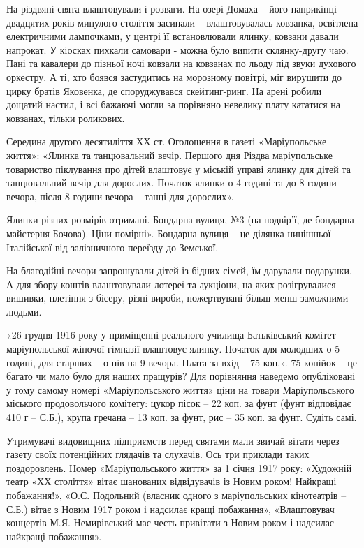 На різдвяні свята влаштовували і розваги. На озері Домаха – його наприкінці
двадцятих років минулого століття засипали – влаштовувалась ковзанка, освітлена
електричними лампочками, у центрі її встановлювали ялинку, ковзани давали
напрокат. У кіосках пихкали самовари - можна було випити склянку-другу чаю.
Пані та кавалери до пізньої ночі ковзали на ковзанах по льоду під звуки
духового оркестру. А ті, хто боявся застудитись на морозному повітрі, міг
вирушити до цирку братів Яковенка, де споруджувався скейтинг-ринг. На арені
робили дощатий настил, і всі бажаючі могли за порівняно невелику плату кататися
на ковзанах, тільки роликових.

Середина другого десятиліття ХХ ст. Оголошення в газеті «Маріупольське життя»:
«Ялинка та танцювальний вечір. Першого дня Різдва маріупольське товариство
піклування про дітей влаштовує у міській управі ялинку для дітей та
танцювальний вечір для дорослих. Початок ялинки о 4 годині та до 8 години
вечора, після 8 години вечора – танці для дорослих».

Ялинки різних розмірів отримані. Бондарна вулиця, №3 (на подвір'ї, де бондарна
майстерня Бочова). Ціни помірні». Бондарна вулиця – це ділянка нинішньої
Італійської від залізничного переїзду до Земської.

На благодійні вечори запрошували дітей із бідних сімей, їм дарували подарунки.
А для збору коштів влаштовували лотереї та аукціони, на яких розігрувалися
вишивки, плетіння з бісеру, різні вироби, пожертвувані більш менш заможними
людьми.

«26 грудня 1916 року у приміщенні реального училища Батьківський комітет
маріупольської жіночої гімназії влаштовує ялинку. Початок для молодших о 5
годині, для старших – о пів на 9 вечора. Плата за вхід – 75 коп.». 75 копійок –
це багато чи мало було для наших пращурів? Для порівняння наведемо опубліковані
у тому самому номері «Маріупольського життя» ціни на товари Маріупольського
міського продовольчого комітету: цукор пісок – 22 коп. за фунт (фунт відповідає
410 г – С.Б.), крупа гречана – 13 коп. за фунт, рис – 35 коп. за фунт. Судіть
самі.

Утримувачі видовищних підприємств перед святами мали звичай вітати через газету
своїх потенційних глядачів та слухачів. Ось три приклади таких поздоровлень.
Номер «Маріупольського життя» за 1 січня 1917 року: «Художній театр «ХХ
століття» вітає шанованих відвідувачів із Новим роком! Найкращі побажання!»,
«О.С. Подольний (власник одного з маріупольських кінотеатрів – С.Б.) вітає з
Новим 1917 роком і надсилає кращі побажання», «Влаштовувач концертів М.Я.
Немирівський має честь привітати з Новим роком і надсилає найкращі побажання».

